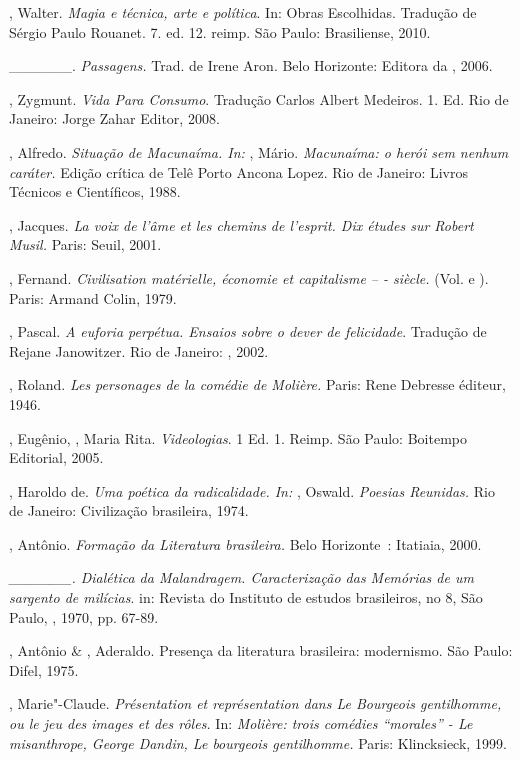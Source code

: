 {\begin{Parskip}
, Walter. \emph{Magia e técnica, arte e política}. In: Obras
Escolhidas. Tradução de Sérgio Paulo Rouanet. 7. ed. 12. reimp. São
Paulo: Brasiliense, 2010.

\_\_\_\_\_\_. \emph{Passagens.} Trad. de Irene Aron. Belo Horizonte:
Editora da , 2006.

, Zygmunt. \emph{Vida Para Consumo}. Tradução Carlos Albert
Medeiros. 1. Ed. Rio de Janeiro: Jorge Zahar Editor, 2008.

, Alfredo. \emph{Situação de Macunaíma. In:} , Mário.
\emph{Macunaíma: o herói sem nenhum caráter.} Edição crítica de Telê
Porto Ancona Lopez. Rio de Janeiro: Livros Técnicos e Científicos, 1988.

, Jacques. \emph{La voix de l'âme et les chemins de
l'esprit. Dix études sur Robert Musil.} Paris: Seuil, 2001.

, Fernand. \emph{Civilisation matérielle, économie et
capitalisme -- - siècle.} (Vol.  e ). Paris: Armand Colin,
1979.

, Pascal. \emph{A euforia perpétua. Ensaios sobre o dever de
felicidade}. Tradução de Rejane Janowitzer. Rio de Janeiro:
, 2002.

, Roland. \emph{Les personages de la comédie de Molière.}
Paris: Rene Debresse éditeur, 1946.

, Eugênio, , Maria Rita. \emph{Videologias}. 1 Ed. 1.
Reimp. São Paulo: Boitempo Editorial, 2005.

, Haroldo de. \emph{Uma poética da radicalidade. In:} ,
Oswald. \emph{Poesias Reunidas.} Rio de Janeiro: Civilização
brasileira, 1974.

, Antônio. \emph{Formação da Literatura brasileira.} Belo
Horizonte~: Itatiaia, 2000.

\emph{\_\_\_\_\_\_. Dialética da Malandragem. Caracterização das
Memórias de um sargento de milícias}. in: Revista do Instituto de
estudos brasileiros, no 8, São Paulo, , 1970, pp. 67-89.

, Antônio \& , Aderaldo. Presença da literatura
brasileira: modernismo. São Paulo: Difel, 1975.

, Marie"-Claude. \emph{Présentation et représentation dans Le
Bourgeois gentilhomme, ou le jeu des images et des rôles.} In:
\emph{Molière: trois comédies ``morales'' - Le misanthrope, George
Dandin, Le bourgeois gentilhomme.} Paris: Klincksieck, 1999.


\end{Parskip}}
